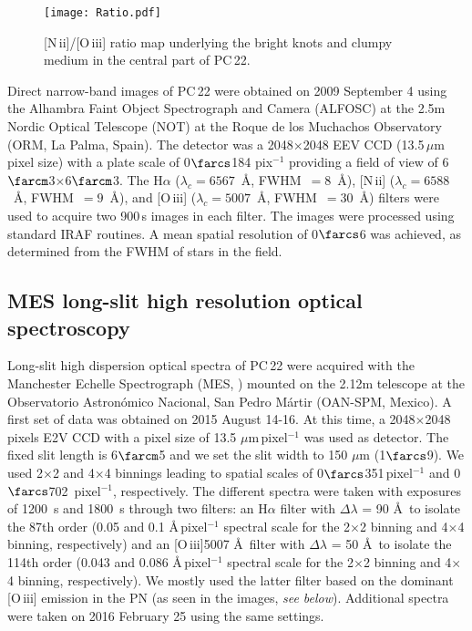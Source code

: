 \documentclass[fleqn,usenatbib,useAMS]{mnras}
\begin{document}
\begin{figure}
\begin{center}
\texttt{[image: Ratio.pdf]}
\vspace{-0.5cm}
\caption{
[N\,{\sc ii}]/[O\,{\sc iii}] ratio map underlying the bright knots and
clumpy medium in the central part of PC\,22.
}
\label{ratio}
\end{center}
\end{figure} 


Direct narrow-band images of PC\,22 were obtained on 2009 September 4
using the Alhambra Faint Object Spectrograph and Camera (ALFOSC) at
the 2.5m Nordic Optical Telescope (NOT) at the Roque de los Muchachos
Observatory (ORM, La Palma, Spain). 
The detector was a 2048$\times$2048 EEV CCD (13.5\,$\mu$m pixel size)
with a plate scale of 0$\farcs$184 pix$^{-1}$ providing a field of view
of 6$\farcm$3$\times$6$\farcm$3. 
The H$\alpha$ (\mbox{$\lambda_c = 6567$ \AA}, \mbox{FWHM $= 8$ \AA )},
[N\,{\sc ii}] (\mbox{$\lambda_c = 6588$ \AA}, \mbox{FWHM $= 9$ \AA)}, and
[O\,{\sc iii}] (\mbox{$\lambda_c = 5007$ \AA}, \mbox{FWHM $= 30$ \AA)}
filters were used to acquire two 900\,s images in each filter.
The images were processed using standard {\sc IRAF} routines.
A mean spatial resolution of 0$\farcs$6 was achieved, as determined
from the FWHM of stars in the field.



\subsection{MES long-slit high resolution optical spectroscopy} 

Long-slit high dispersion optical spectra of PC\,22 were acquired with the
Manchester Echelle Spectrograph (MES, \citealt{Meaburn2003}) mounted on the
2.12m telescope at the Observatorio Astron\'omico Nacional, San Pedro
M\'artir (OAN-SPM, Mexico).
A first set of data was obtained on 2015 August 14-16.
At this time, a 2048$\times$2048 pixels E2V CCD with a pixel size of
13.5 $\mu$m\,pixel$^{-1}$ was used as detector.
The fixed slit length is 6$\farcm$5 and we set the slit width to 150 $\mu$m
(1$\farcs$9).
We used 2$\times$2 and 4$\times$4 binnings leading to spatial scales of
0$\farcs$351\,pixel$^{-1}$ and 0$\farcs$702 \,pixel$^{-1}$, respectively.
The different spectra were taken with exposures of 1200~s and 1800~s
through two filters: an H$\alpha$ filter with $\Delta\lambda$ = 90 \AA\
to isolate the 87th order (0.05 and 0.1 \AA\,pixel$^{-1}$ spectral
scale for the 2$\times$2 binning and 4$\times$4 binning, respectively)
and an [O\,{\sc iii}]5007 \AA\ filter with $\Delta\lambda$ = 50 \AA\ to
isolate the 114th order (0.043 and 0.086 \AA\,pixel$^{-1}$ spectral scale
for the 2$\times$2 binning and 4$\times$4 binning, respectively).
We mostly used the latter filter based on the dominant [O\,{\sc iii}]
emission in the PN (as seen in the images, {\it see below}). Additional spectra were taken on 2016 February 25 using the same settings.
\end{document}
